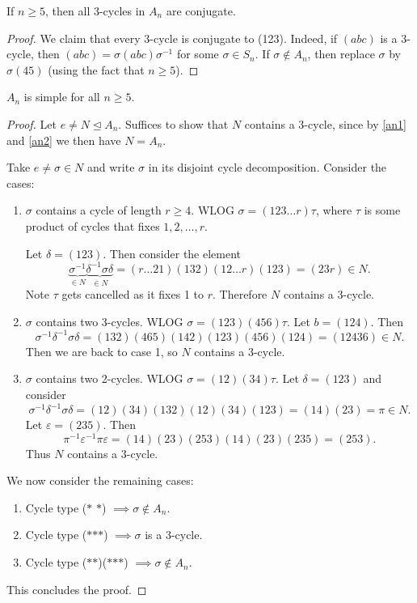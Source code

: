 \documentclass[egregdoesnotlikesansseriftitles,a4paper]{scrartcl}
\begin{document}
\begin{lemma}\label{an2}
     If $n \geq 5$, then all 3-cycles in $A_n$ are conjugate. 
\end{lemma}
\begin{proof}
     We claim that every 3-cycle is conjugate to (123). Indeed, if $(abc)$ is a 3-cycle, then $(abc)=\sigma (abc) {\sigma}^{-1}$ for some $\sigma \in S_n$. If $\sigma \notin A_{n}$, then replace $\sigma$ by $\sigma (45)$ (using the fact that $n \geq 5$).
\end{proof}
\begin{theorem}
      $A_n$ is simple for all $n \geq 5$.
      \begin{proof}
            Let $e \neq N \unlhd A_{n}$. Suffices to show that $N$ contains a 3-cycle, since by \ref{an1} and \ref{an2} we then have $N=A_n$.
      
            Take $e \neq \sigma \in N$ and write $\sigma$ in its disjoint cycle decomposition. Consider the cases: 
            \begin{enumerate}
                 \item  $\sigma$ contains a cycle of length $r \geq 4$. WLOG $\sigma=(123 \ldots r)\tau$, where $\tau$ is some product of cycles that fixes $1,2, \ldots ,r$. 
                 
                 Let $\delta =(123)$. Then consider the element \[
                 \underbrace{{\sigma}^{-1}}_{\in N} \underbrace{{\delta}^{-1} \sigma \delta}_{\in N} = (r \ldots 21)(132)(12 \ldots r)(123)=(23r) \in N
                 .\] Note $\tau$ gets cancelled as it fixes 1 to $r$. Therefore $N$ contains a 3-cycle. 
                 \item $\sigma$ contains two 3-cycles. WLOG $\sigma= (123)(456)\tau$. Let $b=(124).$ Then \[
                     {\sigma}^{-1} {\delta}^{-1} \sigma \delta = (132)(465)(142)(123)(456)(124)=(12436) \in N
                .\] Then we are back to case 1, so $N$ contains a 3-cycle.
                \item $\sigma$ contains two 2-cycles. WLOG $\sigma=(12)(34)\tau$. Let $\delta=(123)$ and consider \[
                     {\sigma}^{-1} {\delta}^{-1} \sigma \delta = (12)(34)(132)(12)(34)(123)=(14)(23)=\pi \in N
                     .\] Let $\varepsilon= (235)$. Then \[
                     {\pi}^{-1}{\varepsilon}^{-1}\pi \varepsilon =(14)(23)(253)(14)(23)(235)=(253)
                     .\] Thus $N$ contains a 3-cycle.
            \end{enumerate}
            We now consider the remaining cases:
            \begin{enumerate}
                 \item Cycle type ($\ast$ $\ast$) $\implies \sigma \notin A_n$.
                 \item Cycle type ($\ast$$\ast$$\ast$) $\implies \sigma$ is a 3-cycle.
                 \item Cycle type ($\ast$$\ast$)($\ast$$\ast$$\ast$) $\implies  \sigma \notin A_n$. 
            \end{enumerate}
            This concludes the proof.
      \end{proof}
\end{theorem}
\newpage
\end{document}
